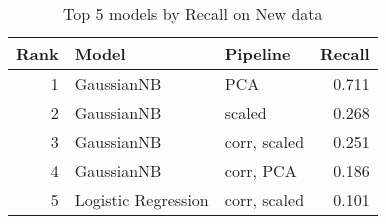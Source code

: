 \begin{table}[!htb]
\centering
\begin{tabular}{rllr}
\toprule
Rank & Model & Pipeline & Recall \\
\midrule
1 & GaussianNB & PCA & 0.711 \\
2 & GaussianNB & scaled & 0.268 \\
3 & GaussianNB & corr, scaled & 0.251 \\
4 & GaussianNB & corr, PCA & 0.186 \\
5 & Logistic Regression & corr, scaled & 0.101 \\
\bottomrule
\end{tabular}
\caption{Top 5 models by Recall on New data}
\label{table-top-5-recall-new}
\end{table}

